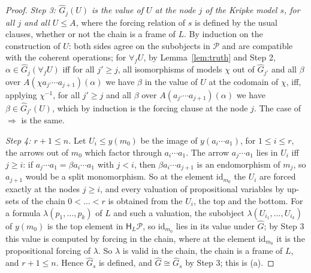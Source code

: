\documentclass[11pt]{amsart}
\theoremstyle{definition}
\newcommand{\HH}{\mathsf H}
\newcommand{\cP}{\mathcal P}
\newcommand{\id}{\mathrm{id}}
\begin{document}
\begin{proof}
\emph{Step 3: $\hat G_j(U)$ is the value of $U$ at the node $j$ of the
Kripke model $s$, for all $j$ and all $U\le A$,} where the forcing
relation of $s$ is defined by the usual clauses, whether or not the
chain is a frame of $L$. By induction on the construction of $U$: both
sides agree on the subobjects in $\cP$ and are compatible with the
coherent operations; for $\forall_fU$, by Lemma~\ref{lem:truth} and
Step 2, $\alpha\in\hat G_j(\forall_fU)$ iff for all $j'\ge j$, all
isomorphisms of models $\chi$ out of $\hat G_{j'}$ and all $\beta$
over $A(\chi a_{j'}\cdots a_{j+1})(\alpha)$ we have $\beta$ in the
value of $U$ at the codomain of $\chi$, iff, applying $\chi^{-1}$, for
all $j'\ge j$ and all $\beta$ over $A(a_{j'}\cdots a_{j+1})(\alpha)$
we have $\beta\in\hat G_{j'}(U)$, which by induction is the forcing
clause at the node $j$. The case of $\Rightarrow$ is the same.

\emph{Step 4: $r+1\le n$.} Let $U_i\le y(m_0)$ be the image of
$y(a_i\cdots a_1)$, for $1\le i\le r$, the arrows out of $m_0$ which
factor through $a_i\cdots a_1$. The arrow $a_j\cdots a_1$ lies in $U_i$
iff $j\ge i$: if $a_j\cdots a_1=\beta a_i\cdots a_1$ with $j<i$, then
$\beta a_i\cdots a_{j+1}$ is an endomorphism of $m_j$, so $a_{j+1}$
would be a split monomorphism. So at the element $\id_{m_0}$ the $U_i$
are forced exactly at the nodes $j\ge i$, and every valuation of
propositional variables by up-sets of the chain $0<\dots<r$ is
obtained from the $U_i$, the top and the bottom. For a formula
$\lambda(p_1,\dots,p_k)$ of $L$ and such a valuation, the subobject
$\lambda(U_{i_1},\dots,U_{i_k})$ of $y(m_0)$ is the top element in
$\HH_L\cP$, so $\id_{m_0}$ lies in its value under $\hat G$; by Step 3
this value is computed by forcing in the chain, where at the element
$\id_{m_0}$ it is the propositional forcing of $\lambda$. So $\lambda$
is valid in the chain, the chain is a frame of $L$, and $r+1\le n$.
Hence $\hat G_s$ is defined, and $\hat G\cong\hat G_s$ by Step 3; this
is (a).


\end{proof}
\end{document}
